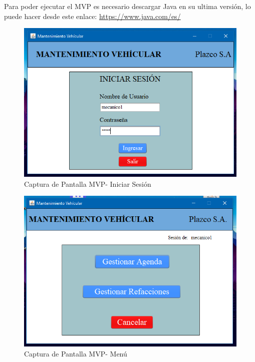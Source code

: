 Para poder ejecutar el MVP es necesario descargar Java en su ultima versión, lo puede hacer desde este enlace: \url{https://www.java.com/es/}
\vspace{3cm}
\begin{figure}[!h]
	\centering
	\includegraphics[width=1\textwidth]{./apendice/imagenes/login}
	\caption{Captura de Pantalla MVP- Iniciar Sesión}
	\label{fig:Captura de Pantalla MVP- Iniciar Sesion}
\end{figure}
\clearpage
\begin{figure}
	\centering
	\includegraphics[width=1\textwidth]{./apendice/imagenes/menu}
	\caption{Captura de Pantalla MVP- Menú}
	\label{fig:Captura de Pantalla MVP- Menu}
\end{figure}

